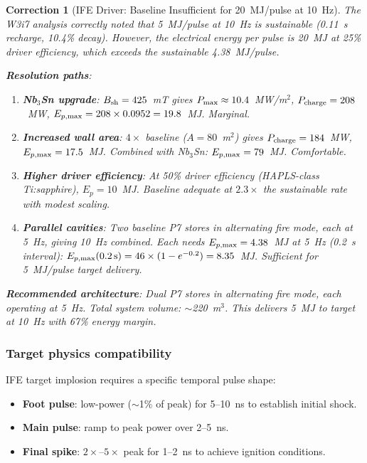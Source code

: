 \documentclass[11pt]{article}
\newtheorem{correction}{Correction}
\newcommand{\Pmax}{P_{\rm max}}
\begin{document}
\begin{correction}[IFE Driver: Baseline Insufficient for 20~MJ/pulse at 10~Hz]
\label{corr:IFE-baseline}
The W3i7 analysis correctly noted that 5~MJ/pulse at 10~Hz is sustainable
(0.11~s recharge, 10.4\% decay). However, the \emph{electrical} energy per
pulse is 20~MJ at 25\% driver efficiency, which exceeds the sustainable
4.38~MJ/pulse.

\textbf{Resolution paths}:
\begin{enumerate}[nosep]
  \item \textbf{Nb$_3$Sn upgrade}: $B_{\rm sh} = 425$~mT gives
    $\Pmax \approx 10.4$~MW/m$^2$, $P_{\rm charge} = 208$~MW,
    $E_{p,\rm max} = 208 \times 0.0952 = 19.8$~MJ. Marginal.
  \item \textbf{Increased wall area}: $4\times$ baseline ($A = 80$~m$^2$)
    gives $P_{\rm charge} = 184$~MW, $E_{p,\rm max} = 17.5$~MJ.
    Combined with Nb$_3$Sn: $E_{p,\rm max} = 79$~MJ. Comfortable.
  \item \textbf{Higher driver efficiency}: At 50\% driver efficiency
    (HAPLS-class Ti:sapphire), $E_p = 10$~MJ. Baseline adequate at
    $2.3\times$ the sustainable rate with modest scaling.
  \item \textbf{Parallel cavities}: Two baseline P7 stores in alternating
    fire mode, each at 5~Hz, giving 10~Hz combined. Each needs
    $E_{p,\rm max} = 4.38$~MJ at 5~Hz (0.2~s interval):
    $E_{p,\rm max}(0.2\,\text{s}) = 46 \times (1-e^{-0.2}) = 8.35$~MJ.
    Sufficient for 5~MJ/pulse target delivery.
\end{enumerate}

\textbf{Recommended architecture}: Dual P7 stores in alternating fire
mode, each operating at 5~Hz. Total system volume: $\sim$220~m$^3$.
This delivers 5~MJ to target at 10~Hz with 67\% energy margin.
\end{correction}

\subsubsection{Target physics compatibility}

IFE target implosion requires a specific temporal pulse shape:
\begin{itemize}[nosep]
  \item \textbf{Foot pulse}: low-power ($\sim$1\% of peak) for 5--10~ns
    to establish initial shock.
  \item \textbf{Main pulse}: ramp to peak power over 2--5~ns.
  \item \textbf{Final spike}: $2\times$--$5\times$ peak for 1--2~ns
    to achieve ignition conditions.
\end{itemize}
\end{document}
